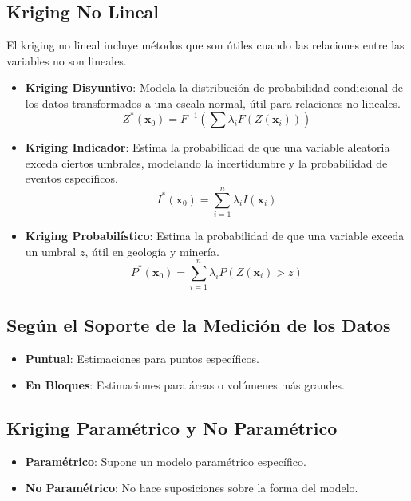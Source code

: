 \subsection{Kriging No Lineal}

El kriging no lineal incluye métodos que son útiles cuando las relaciones entre las variables no son lineales.

\begin{itemize}
    \item \textbf{Kriging Disyuntivo}: Modela la distribución de probabilidad condicional de los datos transformados a una escala normal, útil para relaciones no lineales.
    \[
    Z^*(\mathbf{x}_0) = F^{-1}\left(\sum \lambda_i F(Z(\mathbf{x}_i))\right)
    \]
    
    \item \textbf{Kriging Indicador}: Estima la probabilidad de que una variable aleatoria exceda ciertos umbrales, modelando la incertidumbre y la probabilidad de eventos específicos.
    \[
    I^*(\mathbf{x}_0) = \sum_{i=1}^{n} \lambda_i I(\mathbf{x}_i)
    \]
    
    \item \textbf{Kriging Probabilístico}: Estima la probabilidad de que una variable exceda un umbral \(z\), útil en geología y minería.
    \[
    P^*(\mathbf{x}_0) = \sum_{i=1}^{n} \lambda_i P(Z(\mathbf{x}_i) > z)
    \]
\end{itemize}

\subsection{Según el Soporte de la Medición de los Datos}

\begin{itemize}
    \item \textbf{Puntual}: Estimaciones para puntos específicos.
    \item \textbf{En Bloques}: Estimaciones para áreas o volúmenes más grandes.
\end{itemize}

\subsection{Kriging Paramétrico y No Paramétrico}

\begin{itemize}
    \item \textbf{Paramétrico}: Supone un modelo paramétrico específico.
    \item \textbf{No Paramétrico}: No hace suposiciones sobre la forma del modelo.
    \end{itemize}


